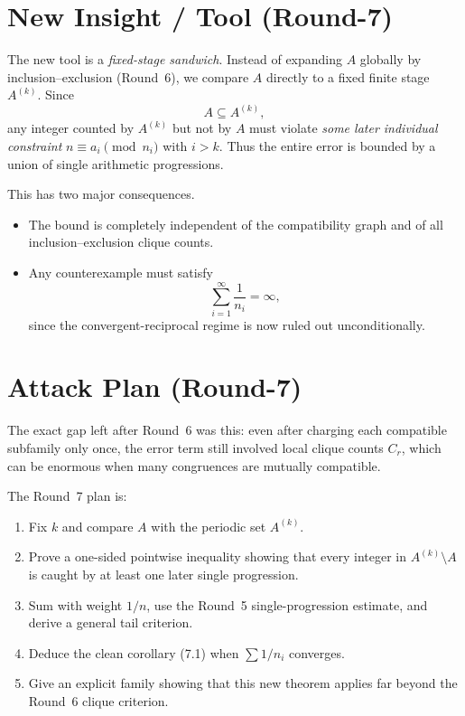 \section{New Insight / Tool (Round-7)}
The new tool is a \emph{fixed-stage sandwich}.
Instead of expanding \(A\) globally by inclusion--exclusion (Round~6), we compare \(A\) directly to a fixed finite stage
\(A^{(k)}\).
Since
\[
A\subseteq A^{(k)},
\]
any integer counted by \(A^{(k)}\) but not by \(A\) must violate \emph{some later individual constraint}
\(n\equiv a_i\pmod{n_i}\) with \(i>k\).
Thus the entire error is bounded by a union of single arithmetic progressions.

This has two major consequences.
\begin{itemize}
\item The bound is completely independent of the compatibility graph and of all inclusion--exclusion clique counts.
\item Any counterexample must satisfy
\begin{equation}
\sum_{i=1}^{\infty}\frac1{n_i}=\infty,
\tag{7.2}
\end{equation}
since the convergent-reciprocal regime is now ruled out unconditionally.
\end{itemize}

\section{Attack Plan (Round-7)}
The exact gap left after Round~6 was this: even after charging each compatible subfamily only once, the error term still
involved local clique counts \(C_r\), which can be enormous when many congruences are mutually compatible.

The Round~7 plan is:
\begin{enumerate}
\item Fix \(k\) and compare \(A\) with the periodic set \(A^{(k)}\).
\item Prove a one-sided pointwise inequality showing that every integer in \(A^{(k)}\setminus A\) is caught by at least
one later single progression.
\item Sum with weight \(1/n\), use the Round~5 single-progression estimate, and derive a general tail criterion.
\item Deduce the clean corollary (7.1) when \(\sum 1/n_i\) converges.
\item Give an explicit family showing that this new theorem applies far beyond the Round~6 clique criterion.
\end{enumerate}

